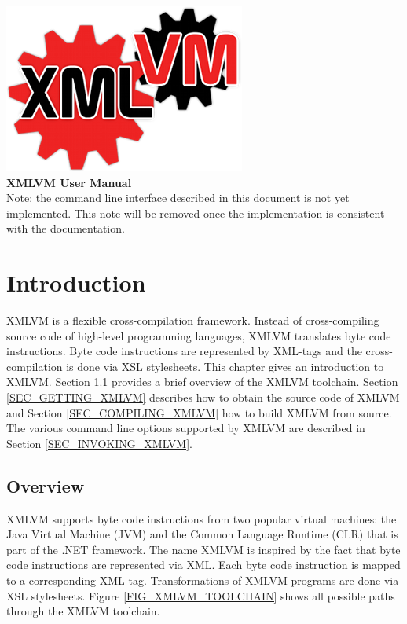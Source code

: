 \documentclass[11pt]{book}
\begin{document}
\begin{titlepage}
\begin{center}
\includegraphics{pics/xmlvm_logo.png}
\Huge
\\[3cm]
\textbf{XMLVM User Manual}
\normalsize
\\[5cm]
Note: the command line interface described in this document is not
yet implemented. This note will be removed once the implementation is
consistent with the documentation.
\end{center}
\end{titlepage}

\tableofcontents


\chapter{Introduction}

XMLVM is a flexible cross-compilation framework. Instead of
cross-compiling source code of high-level programming languages, XMLVM
translates byte code instructions. Byte code instructions are
represented by XML-tags and the cross-compilation is done via XSL
stylesheets. This chapter gives an introduction to XMLVM. Section
\ref{SEC_OVERVIEW} provides a brief overview of the XMLVM toolchain.
Section \ref{SEC_GETTING_XMLVM} describes how to obtain the source
code of XMLVM and Section \ref{SEC_COMPILING_XMLVM} how to build XMLVM
from source. The various command line options supported by XMLVM are
described in Section \ref{SEC_INVOKING_XMLVM}.


\section{Overview}
\label{SEC_OVERVIEW}

XMLVM supports byte code instructions from two popular virtual
machines: the Java Virtual Machine (JVM) and the Common Language
Runtime (CLR) that is part of the .NET framework. The name XMLVM is
inspired by the fact that byte code instructions are represented via
XML. Each byte code instruction is mapped to a corresponding XML-tag.
Transformations of XMLVM programs are done via XSL stylesheets. Figure
\ref{FIG_XMLVM_TOOLCHAIN} shows all possible paths through the XMLVM
toolchain.
\end{document}
